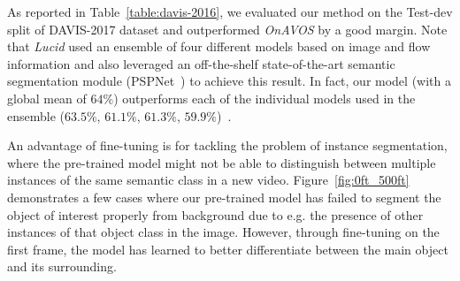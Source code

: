 \documentclass[10pt,twocolumn,letterpaper]{article}
\begin{document}
As reported in Table~\ref{table:davis-2016}, we evaluated our method on the Test-dev split of DAVIS-2017 dataset and outperformed {\it OnAVOS}\cite{onavos} by a good margin. Note that {\it Lucid}\cite{lucid} used an ensemble of four different models based on image and flow information and also leveraged an off-the-shelf state-of-the-art semantic segmentation module (PSPNet~\cite{pspnet}) to achieve this result. In fact, our model (with a global mean of $64\%$) outperforms each of the individual models used in the ensemble ($63.5\%$, $61.1\%$, $61.3\%$, $59.9\%$)~\cite{lucid}.



An advantage of fine-tuning is for tackling the problem of instance
segmentation, where the pre-trained model might not be able to distinguish
between multiple instances of the same semantic class in a new video.
Figure~\ref{fig:0ft_500ft} demonstrates a few cases where our pre-trained model has failed
to segment the object of interest properly from background due to e.g. the presence
of other instances of that object class in the image. However, through
fine-tuning on the first frame, the model has learned to better differentiate
between the main object and its surrounding.
\end{document}
